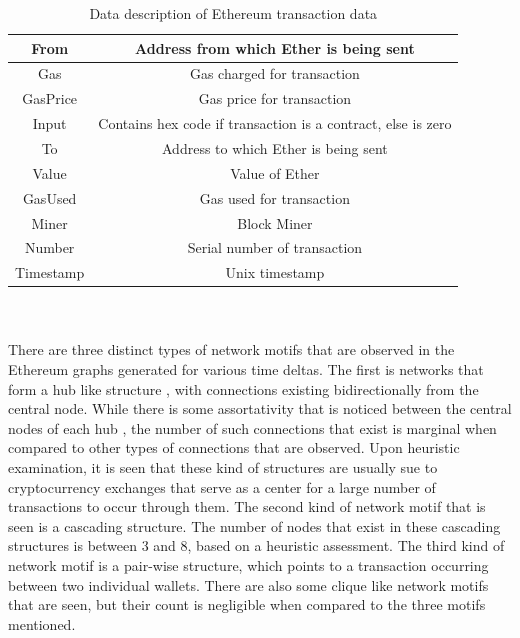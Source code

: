 \documentclass[12pt]{article}%
\begin{document}
\begin{center}
\begin{table}[h]
\centering
\begin{tabular}{ |c|c| } 
 \hline
 From & Address from which Ether is being sent  \\ 
\hline 
 Gas & Gas charged for transaction \\ 
\hline 
 GasPrice & Gas price for transaction \\ 
 \hline
 Input & Contains hex code if transaction is a contract, else is zero \\ 
 \hline
 To & Address to which Ether is being sent \\ 
 \hline
 Value & Value of Ether \\ 
 \hline
 GasUsed & Gas used for transaction \\ 
 \hline
 Miner & Block Miner \\ 
 \hline
 Number & Serial number of transaction \\ 
 \hline
 Timestamp & Unix timestamp \\ 
 \hline

\end{tabular}
\\[10pt]
\caption{Data description of Ethereum transaction data}
\end{table}
\end{center}

\paragraph{}There are three distinct types of network motifs that are observed in the Ethereum graphs generated for various time deltas. The first is networks that form a hub like structure , with connections existing bidirectionally from the central node. While there is some assortativity that is noticed between the central nodes of each hub , the number of such connections that exist is marginal when compared to other types of connections that are observed. Upon heuristic examination, it is seen that these kind of structures are usually sue to cryptocurrency exchanges that serve as a center for a large number of transactions to occur through them. The second kind of network motif that is seen is a cascading structure. The number of nodes that exist in these cascading structures is between 3 and 8, based on a heuristic assessment. The third kind of network motif is a pair-wise structure, which points to a transaction occurring between two individual wallets. There are also some clique like network motifs that are seen, but their count is negligible when compared to the three motifs mentioned. 
\end{document}
